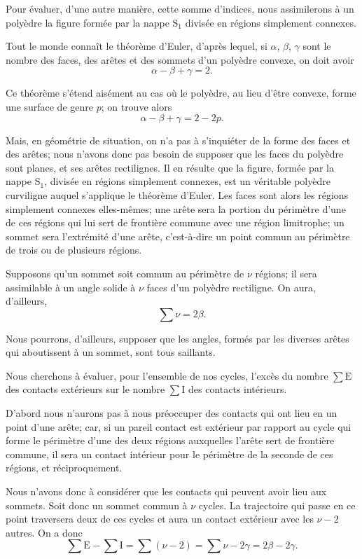 \documentclass[11pt]{article}
\begin{document}
Pour évaluer, d’une autre manière, cette somme d’indices, nous assimilerons à un polyèdre la figure formée par la nappe $\mathrm{S}_1$ divisée en régions simplement connexes.

Tout le monde connaît le théorème d’Euler, d’après lequel, si $\alpha$, $\beta$, $\gamma$ sont le nombre des faces, des arêtes et des sommets d’un polyèdre convexe, on doit avoir
\[
\alpha-\beta+\gamma=2.
\]

Ce théorème s’étend aisément au cas où le polyèdre, au lieu d’être convexe, forme une surface de genre $p$; on trouve alors
\[
\alpha-\beta+\gamma=2-2p.
\]

Mais, en géométrie de situation, on n’a pas à s’inquiéter de la forme des faces et des arêtes; nous n’avons donc pas besoin de supposer que les faces du polyèdre sont planes, et ses arêtes rectilignes. Il en résulte que la figure, formée par la nappe $\mathrm{S}_1$, divisée en régions simplement connexes, est un véritable polyèdre curviligne auquel s’applique le théorème d’Euler. Les faces sont alors les régions simplement connexes elles-mêmes; une arête sera la portion du périmètre d’une de ces régions qui lui sert de frontière commune avec une région limitrophe; un sommet sera l’extrémité d’une arête, c’est-à-dire un point commun au périmètre de trois ou de plusieurs régions.

Supposons qu’un sommet soit commun au périmètre de $\nu$ régions; il sera assimilable à un angle solide à $\nu$ faces d’un polyèdre rectiligne. On aura, d’ailleurs,
\[
\sum \nu=2\beta.
\]

Nous pourrons, d’ailleurs, supposer que les angles, formés par les diverses arêtes qui aboutissent à un sommet, sont tous saillants.

Nous cherchons à évaluer, pour l’ensemble de nos cycles, l’excès du nombre $\sum\mathrm{E}$ des contacts extérieurs sur le nombre $\sum\mathrm{I}$ des contacts intérieurs.

D’abord nous n’aurons pas à nous préoccuper des contacts qui ont lieu en un point d’une arête; car, si un pareil contact est extérieur par rapport au cycle qui forme le périmètre d’une des deux régions auxquelles l’arête sert de frontière commune, il sera un contact intérieur pour le périmètre de la seconde de ces régions, et réciproquement.

Nous n’avons donc à considérer que les contacts qui peuvent avoir lieu aux sommets. Soit donc un sommet commun à $\nu$ cycles. La trajectoire qui passe en ce point traversera deux de ces cycles et aura un contact extérieur avec les $\nu-2$ autres. On a donc
\[
\sum\mathrm{E}-\sum\mathrm{I}=\sum(\nu-2)=\sum\nu-2\gamma=2\beta-2\gamma.
\]
\end{document}
